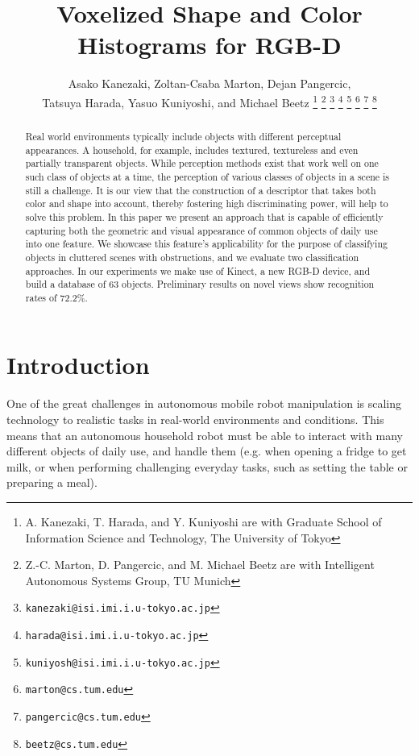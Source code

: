 \documentclass[a4paper, 10 pt, conference]{sty/ieeeconf}
\title{%
Voxelized Shape and Color Histograms for RGB-D}
\author{Asako Kanezaki, Zoltan-Csaba Marton, Dejan Pangercic,\\ Tatsuya Harada, Yasuo Kuniyoshi, and Michael Beetz%
\thanks{A. Kanezaki, T. Harada, and Y. Kuniyoshi are with Graduate School of Information Science and Technology, The University of Tokyo
}
\thanks{Z.-C. Marton, D. Pangercic, and M. Michael Beetz are with Intelligent Autonomous Systems Group, TU Munich
}
\thanks{\tt\small kanezaki@isi.imi.i.u-tokyo.ac.jp}
\thanks{\tt\small harada@isi.imi.i.u-tokyo.ac.jp}
\thanks{\tt\small kuniyosh@isi.imi.i.u-tokyo.ac.jp}
\thanks{\tt\small marton@cs.tum.edu}
\thanks{\tt\small pangercic@cs.tum.edu}
\thanks{\tt\small beetz@cs.tum.edu}
}
\begin{document}
\newcommand{\todo}[1]{\textbf{\textcolor{red}{TODO: #1}}}
\maketitle
\thispagestyle{empty}
\pagestyle{empty}

\begin{abstract}
Real world environments typically include objects with different perceptual appearances.
A household, for example, includes textured, textureless and even partially transparent objects.
While perception methods exist that work well on one such class of objects at a time, the perception of
various classes of objects in a scene is still a challenge.
It is our view that the construction of a descriptor that takes both color and shape into account,
thereby fostering high discriminating power, will help to solve this problem.
In this paper we present an approach that is capable of efficiently capturing both the geometric
and visual appearance of common objects of daily use into one feature.
We showcase this
feature's applicability for the purpose of classifying objects in cluttered scenes with obstructions,
and we evaluate two classification approaches.
In our experiments we make use of Kinect, a new RGB-D device,
and build a database of 63 objects. Preliminary results
on novel views show recognition rates of 72.2\%.
\end{abstract}


\section{Introduction}
One of the great challenges in autonomous mobile robot manipulation is scaling
technology to realistic tasks in real-world environments and
conditions. This means that an autonomous household robot must be able to interact with many
different objects of daily use, and handle them (e.g. when
opening a fridge to get milk, or when performing challenging everyday tasks,
such as setting the table or preparing a meal).
\end{document}
